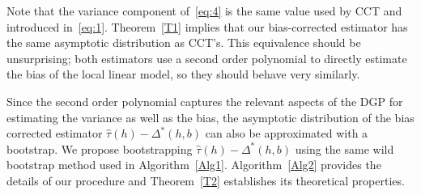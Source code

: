 \documentclass[12pt,fleqn]{article}
\begin{document}
Note that the variance component of~\eqref{eq:4} is the same value used by CCT
and introduced in~\eqref{eq:1}. Theorem~\ref{T1} implies that our bias-corrected
estimator has the same asymptotic distribution as CCT's. This equivalence should
be unsurprising; both estimators use a second order polynomial to directly estimate
the bias of the local linear model, so they should behave very similarly.

Since the second order polynomial captures the relevant aspects of the DGP for
estimating the variance as well as the bias, the asymptotic distribution of the
bias corrected estimator $\hat\tau(h) - \Delta^*(h,b)$ can also be approximated
with a bootstrap. We propose bootstrapping $\hat\tau(h) - \Delta^*(h,b)$ using
the same wild bootstrap method used in Algorithm~\ref{Alg1}. Algorithm~\ref{Alg2} provides the details of our procedure
and Theorem~\ref{T2} establishes its theoretical properties.
\end{document}

